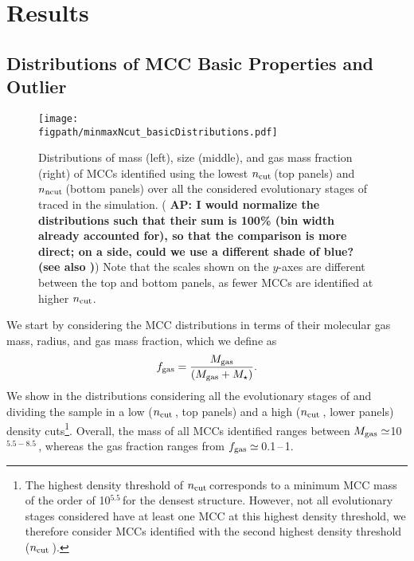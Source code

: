 \IfFileExists{emulateapjlegacy.cls}{\documentclass[iop]{emulateapjlegacy}}{\documentclass[iop]{emulateapj}}
\newcommand{\AP}[1]{({\bf \color{apcolor} AP: #1})}
\def\figpath{./Fig}
\begin{document}
\section{Results}\label{sec:results}

\subsection{Distributions of MCC Basic Properties and Outlier} \label{sec:dist}
\begin{figure*}[htbp]
\centering
\texttt{[image: \\figpath/minmaxNcut\_basicDistributions.pdf]}
\caption{Distributions of mass (left), size (middle), and gas mass fraction (right) of MCCs identified using the lowest 
$n_{\rm cut}$\,\cc (top panels) and $n_{\rm ncut}$\,\cc (bottom panels) over all the considered evolutionary stages of \flower traced in the simulation. \AP{I would normalize the distributions such that their sum is 100\% (bin width already accounted for), so that the comparison is more direct; on a side, could we use a different shade of blue? (see also \Fig{h2density})} Note that the scales shown on the $y$-axes are different between the top and bottom panels, as fewer MCCs are identified at higher $n_{\rm cut}$.
\label{fig:dist}}
\end{figure*}

We start by considering the MCC distributions in terms of their molecular gas mass, radius, and gas mass fraction, which we define as
\begin{equation}
f_{\rm gas} = \frac{M_{\rm gas}} {\left(M_{\rm gas} + M_\star\right)}.
\end{equation}
%
We show in  the distributions considering all the evolutionary stages of \flower and dividing the sample in a low 
($n_{\rm cut}$\,\cc, top panels) and a high ($n_{\rm cut}$\,\cc, lower panels) density cuts\footnote{The highest density threshold of $n_{\rm cut}$\,\cc corresponds to a minimum MCC mass of the order of 10$^{5.5}$\,\Msun for the densest structure. However, not all evolutionary stages considered have at least one MCC at this highest density threshold, we therefore consider MCCs identified with the second highest density threshold ($n_{\rm cut}$\,\cc).}.
%
Overall, the mass of all MCCs identified ranges between $M_{\rm gas}\simeq$10$^{5.5-8.5}$\,\Msun, 
whereas the gas fraction ranges from $f_{\rm gas} \simeq$\,0.1\,--\,1.
\end{document}
